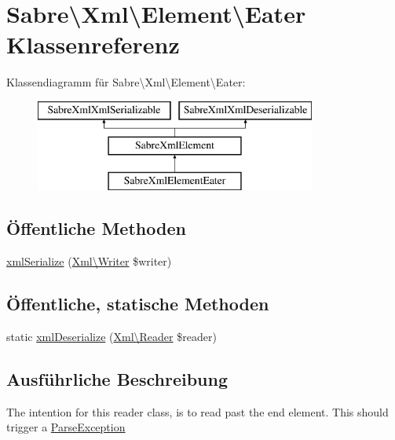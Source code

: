 \hypertarget{class_sabre_1_1_xml_1_1_element_1_1_eater}{}\section{Sabre\textbackslash{}Xml\textbackslash{}Element\textbackslash{}Eater Klassenreferenz}
\label{class_sabre_1_1_xml_1_1_element_1_1_eater}
Klassendiagramm für Sabre\textbackslash{}Xml\textbackslash{}Element\textbackslash{}Eater\+:\begin{figure}[H]
\begin{center}
\leavevmode
\includegraphics[height=3.000000cm]{class_sabre_1_1_xml_1_1_element_1_1_eater}
\end{center}
\end{figure}
\subsection*{Öffentliche Methoden}
\begin{DoxyCompactItemize}
\item 
\mbox{\hyperlink{class_sabre_1_1_xml_1_1_element_1_1_eater_adbcc612a068aafce570395bca752b42f}{xml\+Serialize}} (\mbox{\hyperlink{class_sabre_1_1_xml_1_1_writer}{Xml\textbackslash{}\+Writer}} \$writer)
\end{DoxyCompactItemize}
\subsection*{Öffentliche, statische Methoden}
\begin{DoxyCompactItemize}
\item 
static \mbox{\hyperlink{class_sabre_1_1_xml_1_1_element_1_1_eater_af251bc4f008ecef8fcbacb6996e594b9}{xml\+Deserialize}} (\mbox{\hyperlink{class_sabre_1_1_xml_1_1_reader}{Xml\textbackslash{}\+Reader}} \$reader)
\end{DoxyCompactItemize}


\subsection{Ausführliche Beschreibung}
The intention for this reader class, is to read past the end element. This should trigger a \mbox{\hyperlink{class_sabre_1_1_xml_1_1_parse_exception}{Parse\+Exception}}

